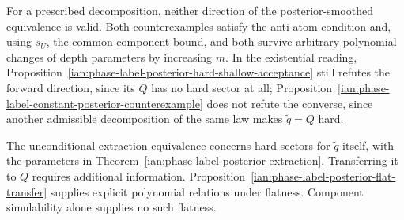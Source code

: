 \begin{remark}
\label{ian:phase-label-posterior-equivalence-status}
For a prescribed decomposition, neither direction of the posterior-smoothed equivalence is valid. Both counterexamples satisfy the anti-atom condition and, using \(s_U\), the common component bound, and both survive arbitrary polynomial changes of depth parameters by increasing \(m\). In the existential reading, Proposition~\ref{ian:phase-label-posterior-hard-shallow-acceptance} still refutes the forward direction, since its \(Q\) has no hard sector at all; Proposition~\ref{ian:phase-label-constant-posterior-counterexample} does not refute the converse, since another admissible decomposition of the same law makes \(\widetilde q=Q\) hard.

The unconditional extraction equivalence concerns hard sectors for
\(\widetilde q\) itself, with the parameters in
Theorem~\ref{ian:phase-label-posterior-extraction}. Transferring it to \(Q\) requires additional information. Proposition~\ref{ian:phase-label-posterior-flat-transfer} supplies explicit polynomial relations under flatness. Component simulability alone supplies no such flatness.
\end{remark}
